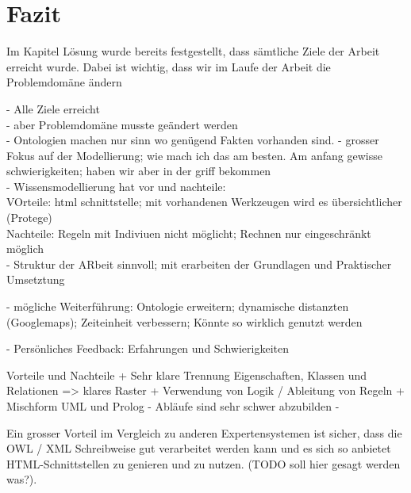 \chapter{Fazit}
\label{chap:fazit}


Im Kapitel Lösung wurde bereits festgestellt, dass sämtliche Ziele der Arbeit erreicht wurde. Dabei ist wichtig, dass wir im Laufe der Arbeit die Problemdomäne ändern 


- Alle Ziele erreicht\\
- aber Problemdomäne musste geändert werden\\
- Ontologien machen nur sinn wo genügend Fakten vorhanden sind.
- grosser Fokus auf der Modellierung; wie mach ich das am besten. Am anfang gewisse schwierigkeiten; haben wir aber in der griff bekommen\\
- Wissensmodellierung hat vor und nachteile:\\
VOrteile: html schnittstelle; mit vorhandenen Werkzeugen wird es übersichtlicher (Protege)\\
Nachteile: Regeln mit Indiviuen nicht möglicht; Rechnen nur eingeschränkt möglich\\
- Struktur der ARbeit sinnvoll; mit erarbeiten der Grundlagen und Praktischer Umsetztung


- mögliche Weiterführung: Ontologie erweitern; dynamische distanzten (Googlemaps); Zeiteinheit verbessern; Könnte so wirklich genutzt werden

- Persönliches Feedback: Erfahrungen und Schwierigkeiten

Vorteile und Nachteile
+ Sehr klare Trennung Eigenschaften, Klassen und Relationen => klares Raster
+ Verwendung von Logik / Ableitung von Regeln
+ Mischform UML und Prolog
- Abläufe sind sehr schwer abzubilden
- 




Ein grosser Vorteil im Vergleich zu anderen Expertensystemen ist sicher, dass die OWL / XML Schreibweise gut verarbeitet werden kann und es sich so anbietet HTML-Schnittstellen zu genieren und zu nutzen.  (TODO soll hier gesagt werden was?). 
